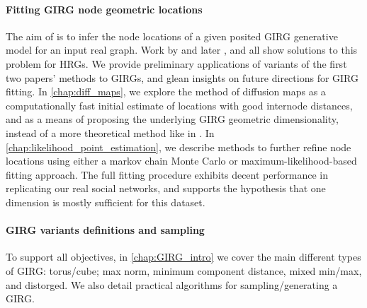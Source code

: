 


\paragraph{Fitting GIRG node geometric locations} The aim of  is to infer the node locations of a given posited GIRG generative model for an input real graph. Work by \cite{boguna2010sustaining} and later \cite{garcia2019mercator}, \cite{blasius2018efficient} and \cite{blasius2021force} all show solutions to this problem for HRGs.
We provide preliminary applications of variants of the first two papers' methods to GIRGs, and glean insights on future directions for GIRG fitting.
In \cref{chap:diff_maps}, we explore the method of diffusion maps as a computationally fast initial estimate of locations with good internode distances, and as a means of proposing the underlying GIRG geometric dimensionality, instead of a more theoretical method like in \cite{friedrich2023simple}.
In \cref{chap:likelihood_point_estimation}, we describe methods to further refine node locations using either a markov chain Monte Carlo or maximum-likelihood-based fitting approach.
The full fitting procedure exhibits decent performance in replicating our real social networks, and supports the hypothesis that one dimension is mostly sufficient for this dataset.

\paragraph{GIRG variants definitions and sampling} To support all objectives, in \cref{chap:GIRG_intro} we cover the main different types of GIRG: torus/cube; max norm, minimum component distance, mixed min/max, and distorged. We also detail practical algorithms for sampling/generating a GIRG.

